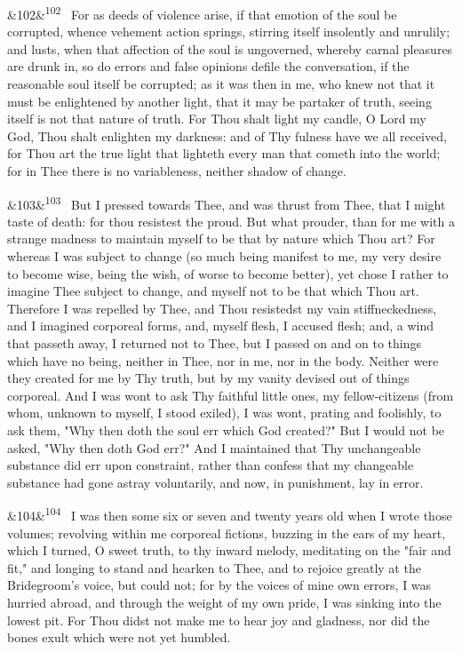 \documentclass[12pt]{article}
\newcommand{\para}[1][]{\par\noindent\ifx&#1&\else\textsuperscript{\footnotesize #1}~\fi}
\begin{document}
\para[102] For as deeds of violence arise, if that emotion of the soul be corrupted, whence vehement action springs, stirring itself insolently and unrulily; and lusts, when that affection of the soul is ungoverned, whereby carnal pleasures are drunk in, so do errors and false opinions defile the conversation, if the reasonable soul itself be corrupted; as it was then in me, who knew not that it must be enlightened by another light, that it may be partaker of truth, seeing itself is not that nature of truth. For Thou shalt light my candle, O Lord my God, Thou shalt enlighten my darkness: and of Thy fulness have we all received, for Thou art the true light that lighteth every man that cometh into the world; for in Thee there is no variableness, neither shadow of change.

\para[103] But I pressed towards Thee, and was thrust from Thee, that I might taste of death: for thou resistest the proud. But what prouder, than for me with a strange madness to maintain myself to be that by nature which Thou art? For whereas I was subject to change (so much being manifest to me, my very desire to become wise, being the wish, of worse to become better), yet chose I rather to imagine Thee subject to change, and myself not to be that which Thou art. Therefore I was repelled by Thee, and Thou resistedst my vain stiffneckedness, and I imagined corporeal forms, and, myself flesh, I accused flesh; and, a wind that passeth away, I returned not to Thee, but I passed on and on to things which have no being, neither in Thee, nor in me, nor in the body. Neither were they created for me by Thy truth, but by my vanity devised out of things corporeal. And I was wont to ask Thy faithful little ones, my fellow-citizens (from whom, unknown to myself, I stood exiled), I was wont, prating and foolishly, to ask them, "Why then doth the soul err which God created?" But I would not be asked, "Why then doth God err?" And I maintained that Thy unchangeable substance did err upon constraint, rather than confess that my changeable substance had gone astray voluntarily, and now, in punishment, lay in error.

\para[104] I was then some six or seven and twenty years old when I wrote those volumes; revolving within me corporeal fictions, buzzing in the ears of my heart, which I turned, O sweet truth, to thy inward melody, meditating on the "fair and fit," and longing to stand and hearken to Thee, and to rejoice greatly at the Bridegroom's voice, but could not; for by the voices of mine own errors, I was hurried abroad, and through the weight of my own pride, I was sinking into the lowest pit. For Thou didst not make me to hear joy and gladness, nor did the bones exult which were not yet humbled.
\end{document}
